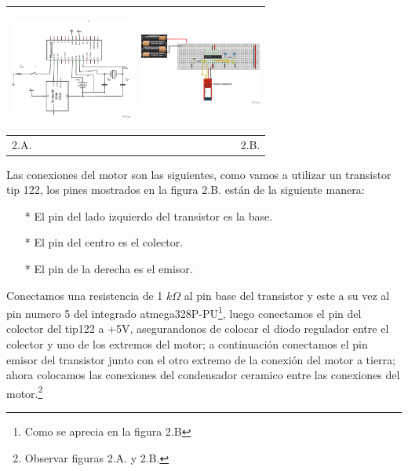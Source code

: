 \documentclass[12]{article}
\newenvironment{Figure}
{\par\medskip\noindent\minipage{\linewidth}}
{\endminipage\par\medskip}
\begin{document}
\begin{multicols}{2}
\begin{Figure}
\center
\begin{tabular}{|l|r|}
\hline
\includegraphics[width=4cm, height=4cm]{img/bluetoothesq.png} & \includegraphics[width=4cm, height=4cm]{img/bluetoothmon.png} \\ \hline
2.A. & 2.B. \\ \hline
\end{tabular}
\label{fig:g2}
\end{Figure}
\vspace{0.2cm}

Las conexiones del motor son las siguientes, como vamos a utilizar un transistor tip\cite{TIP122} 122, los pines mostrados en la figura 2.B.  están de la siguiente manera: 

\begin{enumerate}
\item[*] El pin del lado izquierdo del transistor es la base.
\item[*] El pin del centro es el colector.
\item[*] El pin de la derecha es el emisor.
\end{enumerate}

Conectamos una resistencia de 1 $k \Omega $ al pin base del transistor y este a su vez al pin numero 5 del integrado atmega328P-PU\footnote{Como se aprecia en la figura 2.B}, luego conectamos el pin del colector del tip122 a +5V, asegurandonos de colocar el diodo regulador entre el colector y uno de los extremos del motor; a continuación conectamos el pin emisor del transistor  junto con el otro extremo de la conexión del motor a tierra; ahora colocamos las conexiones del condensador ceramico entre las conexiones del motor.\footnote{Observar figuras 2.A. y 2.B.}



\end{multicols}
\end{document}
